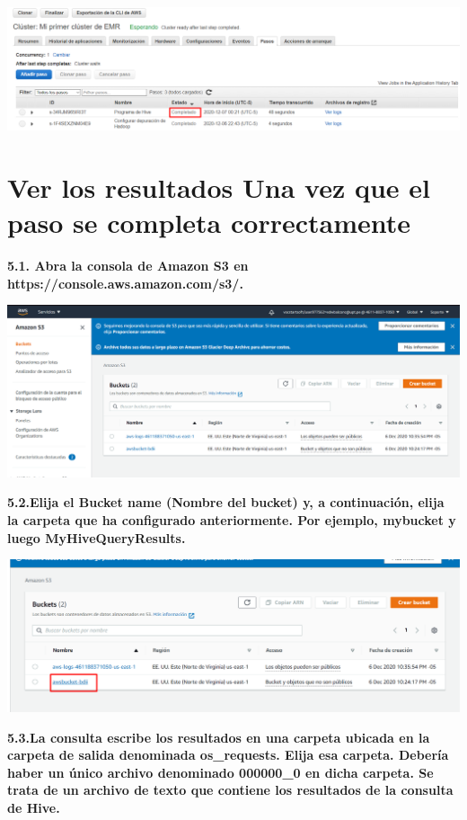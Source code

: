 \documentclass{article}
\begin{document}
    \begin{center}
		\includegraphics[width=15cm]{./images/26} 
	\end{center}


\newpage

\section{Ver los resultados Una vez que el paso se completa correctamente }

\textbf{5.1. Abra la consola de Amazon S3 en https://console.aws.amazon.com/s3/. }

    \begin{center}
		\includegraphics[width=15cm]{./images/27} 
	\end{center}
\textbf{5.2.Elija el Bucket name (Nombre del bucket) y, a continuación, elija la carpeta que ha configurado
anteriormente. Por ejemplo, mybucket y luego MyHiveQueryResults.   }

    \begin{center}
		\includegraphics[width=15cm]{./images/28} 
	\end{center}
	\newpage
\textbf{5.3.La consulta escribe los resultados en una carpeta ubicada en la carpeta de salida denominada
os_requests. Elija esa carpeta. Debería haber un único archivo denominado 000000_0 en dicha
carpeta. Se trata de un archivo de texto que contiene los resultados de la consulta de Hive. 
}
\end{document}

